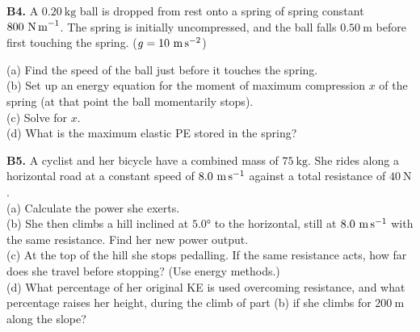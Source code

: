 \begin{exercisebox}[5]
\textbf{B4.} A $0.20\ \text{kg}$ ball is dropped
from rest onto a spring of spring constant
$800\ \text{N\,m}^{-1}$. The spring is initially
uncompressed, and the ball falls $0.50\ \text{m}$
before first touching the spring.
($g = 10\ \text{m\,s}^{-2}$)\\[4pt]
\begin{center}
\end{center}
(a) Find the speed of the ball just before it
touches the spring.\\
(b) Set up an energy equation for the moment of
maximum compression $x$ of the spring (at that
point the ball momentarily stops).\\
(c) Solve for $x$.\\
(d) What is the maximum elastic PE stored in the
spring?
\hfill{}

\vspace{0.4cm}

\textbf{B5.} A cyclist and her bicycle have a
combined mass of $75\ \text{kg}$. She rides along
a horizontal road at a constant speed of
$8.0\ \text{m\,s}^{-1}$ against a total resistance
of $40\ \text{N}$.\\[4pt]
(a) Calculate the power she exerts.\\
(b) She then climbs a hill inclined at $5.0°$ to
the horizontal, still at $8.0\ \text{m\,s}^{-1}$
with the same resistance. Find her new power output.\\
(c) At the top of the hill she stops pedalling.
If the same resistance acts, how far does she
travel before stopping? (Use energy methods.)\\
(d) What percentage of her original KE is used
overcoming resistance, and what percentage raises
her height, during the climb of part (b) if she
climbs for $200\ \text{m}$ along the slope?
\hfill{}

\end{exercisebox}
